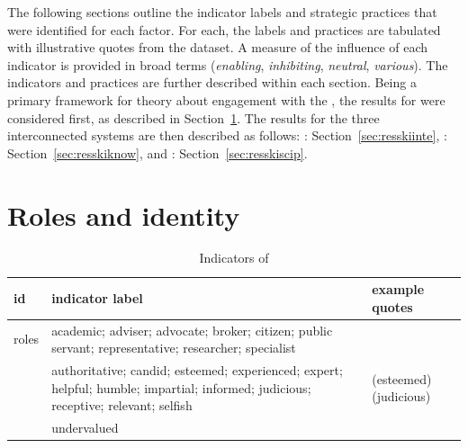 The following sections outline the indicator labels and strategic practices that were identified for each factor. For each, the labels and practices are tabulated with illustrative quotes from the dataset. A measure of the influence of each indicator is provided in broad terms (\emph{enabling}, \emph{inhibiting}, \emph{neutral}, \emph{various}). The indicators and practices are further described within each section. Being a primary framework for theory about engagement with the \SPI, the results for \skirole{} were considered first, as described in Section~\ref{sec:resroles}. The results for the three interconnected systems are then described as follows: \skiinte: Section~\ref{sec:resskiinte}, \skiknow: Section~\ref{sec:resskiknow}, and \skiscip: Section~\ref{sec:resskiscip}. 

\section{Roles and identity}\label{sec:resroles}

\begin{table}[!ht]
\footnotesize
\caption{Indicators of \ismsr{}}\label{tab:resrole}
\begin{tabular}{L{.15\linewidth}L{.35\linewidth}L{.5\linewidth}} \hline
\textbf{id} & \textbf{indicator label} & \textbf{example quotes} \\ \hline \hline
roles & academic; adviser; advocate; broker; citizen; public servant; representative; researcher; specialist &   \vfill {} \\[2mm]\rule{0pt}{4ex}
 & authoritative; candid; esteemed; experienced; expert; helpful; humble; impartial; informed; judicious; receptive; relevant; selfish &  (esteemed) \vfill {} (judicious) \\[2mm] \rule{0pt}{4ex}
& undervalued &  \\ \hline
\end{tabular}
\end{table}


